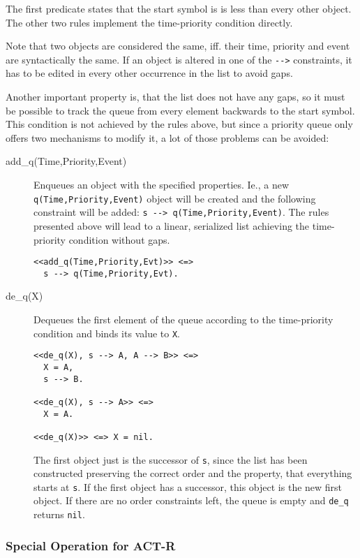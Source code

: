 The first predicate states that the start symbol is is less than every other object. The other two rules implement the time-priority condition directly.

Note that two objects are considered the same, iff. their time, priority and event are syntactically the same. If an object is altered in one of the \lstinline|-->| constraints, it has to be edited in every other occurrence in the   list to avoid gaps.

Another important property is, that the list does not have any gaps, so it must be possible to track the queue from every element backwards to the start symbol. This condition is not achieved by the rules above, but since a priority queue only offers two mechanisms to modify it, a lot of those problems can be avoided:

\begin{description}
 \item[add\_q(Time,Priority,Event)] Enqueues an object with the specified properties. Ie., a new \lstinline|q(Time,Priority,Event)| object will be created and the following constraint will be added: \lstinline|s --> q(Time,Priority,Event)|. The rules presented above will lead to a linear, serialized list achieving the time-priority condition without gaps.
\begin{lstlisting}
<<add_q(Time,Priority,Evt)>> <=>
  s --> q(Time,Priority,Evt).
\end{lstlisting}
 \item[de\_q(X)] Dequeues the first element of the queue according to the time-priority condition and binds its value to \lstinline|X|.
\begin{lstlisting}
<<de_q(X), s --> A, A --> B>> <=>
  X = A,
  s --> B.

<<de_q(X), s --> A>> <=>
  X = A.  
  
<<de_q(X)>> <=> X = nil.
\end{lstlisting}

The first object just is the successor of \lstinline|s|, since the list has been constructed preserving the correct order and the property, that everything starts at \lstinline|s|. If the first object has a successor, this object is the new first object. If there are no order constraints left, the queue is empty and \lstinline|de_q| returns \lstinline|nil|.

\end{description}

\subsubsection{Special Operation for ACT-R}

